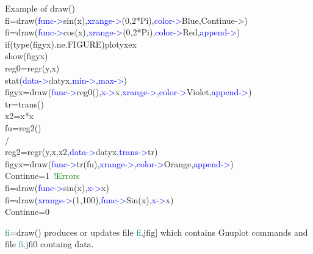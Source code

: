 \begin{example}[drawex]Example of \textcolor{VioletRed}{draw}()\\
\label{drawex}
fi=\textcolor{VioletRed}{draw}(\textcolor{blue}{func->}\textcolor{VioletRed}{sin}(x),\textcolor{blue}{xrange->}(0,2*Pi),\textcolor{blue}{color->}Blue,Continue->)\\
fi=\textcolor{VioletRed}{draw}(\textcolor{blue}{func->}\textcolor{VioletRed}{cos}(x),\textcolor{blue}{xrange->}(0,2*Pi),\textcolor{blue}{color->}Red,\textcolor{blue}{append->})\\
\textcolor{VioletRed}{if}(\textcolor{VioletRed}{type}(figyx).ne.FIGURE)plotyxex\\
\textcolor{VioletRed}{show}(figyx)\\
reg0=\textcolor{VioletRed}{regr}(y,x)\\
\textcolor{VioletRed}{stat}(\textcolor{blue}{data->}datyx,\textcolor{blue}{min->},\textcolor{blue}{max->})\\
figyx=\textcolor{VioletRed}{draw}(\textcolor{blue}{func->}reg0(),\textcolor{blue}{x->}x,\textcolor{blue}{xrange->},\textcolor{blue}{color->}Violet,\textcolor{blue}{append->})\\
tr=\textcolor{VioletRed}{trans}()\\
x2=x*x\\
fu=reg2()\\
/\\
reg2=\textcolor{VioletRed}{regr}(y,x,x2,\textcolor{blue}{data->}datyx,\textcolor{blue}{trans->}tr)\\
figyx=\textcolor{VioletRed}{draw}(\textcolor{blue}{func->}tr(fu),\textcolor{blue}{xrange->},\textcolor{blue}{color->}Orange,\textcolor{blue}{append->})\\
Continue=1 \,\textcolor{green}{!Errors}\\
fi=\textcolor{VioletRed}{draw}(\textcolor{blue}{func->}\textcolor{VioletRed}{sin}(x),\textcolor{blue}{x->}x)\\
fi=\textcolor{VioletRed}{draw}(\textcolor{blue}{xrange->}(1,100),\textcolor{blue}{func->}Sin(x),\textcolor{blue}{x->}x)\\
Continue=0
\end{example}
\begin{note}
\textcolor{teal}{fi}=\textcolor{VioletRed}{draw}() produces or updates file \textcolor{teal}{fi}.jfig] which contains
Gnuplot commands and file \textcolor{teal}{fi}.jfi0 containg data.
\end{note}
